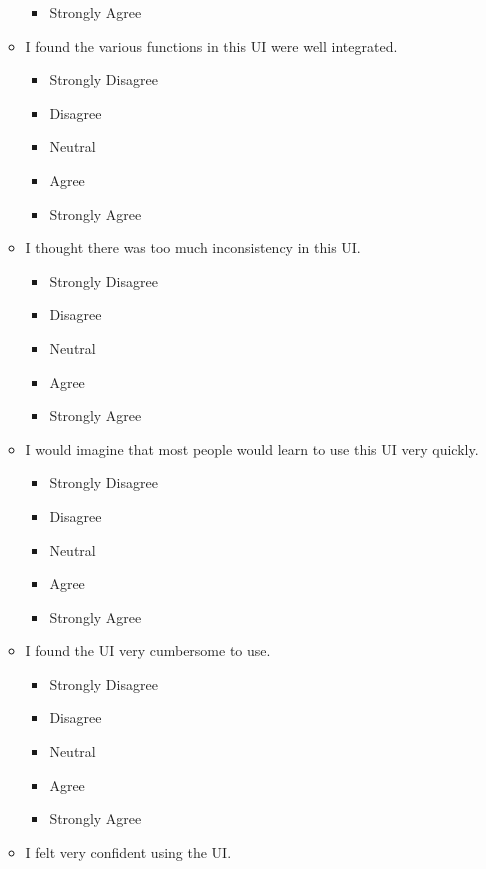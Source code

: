 \documentclass[doublespace,draft,nopageskip]{VTthesis} %
\begin{document}
\begin{itemize}
\begin{itemize}
\begin{itemize}
                \item Strongly Agree
            \end{itemize}
        \item I found the various functions in this UI were well integrated.
            \begin{itemize}
                \item Strongly Disagree
                \item Disagree
                \item Neutral
                \item Agree
                \item Strongly Agree
            \end{itemize}
        \item I thought there was too much inconsistency in this UI.
            \begin{itemize}
                \item Strongly Disagree
                \item Disagree
                \item Neutral
                \item Agree
                \item Strongly Agree
            \end{itemize}
        \item I would imagine that most people would learn to use this UI very quickly.
            \begin{itemize}
                \item Strongly Disagree
                \item Disagree
                \item Neutral
                \item Agree
                \item Strongly Agree
            \end{itemize}
        \item I found the UI very cumbersome to use.
            \begin{itemize}
                \item Strongly Disagree
                \item Disagree
                \item Neutral
                \item Agree
                \item Strongly Agree
            \end{itemize}
	\item I felt very confident using the UI.

\end{itemize}
\end{itemize}
\end{document}
